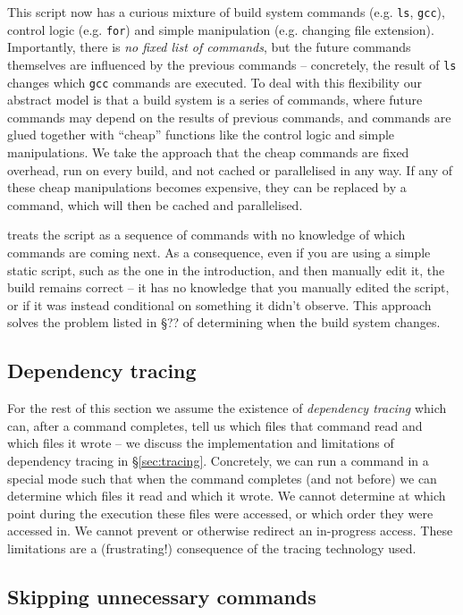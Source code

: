 This script now has a curious mixture of build system commands (e.g. \texttt{ls}, \texttt{gcc}), control logic (e.g. \texttt{for}) and simple manipulation (e.g. changing file extension). Importantly, there is \emph{no fixed list of commands}, but the future commands themselves are influenced by the previous commands -- concretely, the result of \texttt{ls} changes which \texttt{gcc} commands are executed. To deal with this flexibility our abstract model is that a build system is a series of commands, where future commands may depend on the results of previous commands, and commands are glued together with ``cheap'' functions like the control logic and simple manipulations. We take the approach that the cheap commands are fixed overhead, run on every build, and not cached or parallelised in any way. If any of these cheap manipulations becomes expensive, they can be replaced by a command, which will then be cached and parallelised.

\Rattle treats the script as a sequence of commands with no knowledge of which commands are coming next. As a consequence, even if you are using a simple static script, such as the one in the introduction, and then manually edit it, the \Rattle build remains correct -- it has no knowledge that you manually edited the script, or if it was instead conditional on something it didn't observe. This approach solves the problem listed in \cite{build_systems_a_la_carte} \S?? of determining when the build system changes.

\subsection{Dependency tracing}
\label{sec:assume_tracing}

For the rest of this section we assume the existence of \emph{dependency tracing} which can, after a command completes, tell us which files that command read and which files it wrote -- we discuss the implementation and limitations of dependency tracing in \S\ref{sec:tracing}. Concretely, we can run a command in a special mode such that when the command completes (and not before) we can determine which files it read and which it wrote. We cannot determine at which point during the execution these files were accessed, or which order they were accessed in. We cannot prevent or otherwise redirect an in-progress access. These limitations are a (frustrating!) consequence of the tracing technology used.

\subsection{Skipping unnecessary commands}
\label{sec:skipping_unnecessary}

